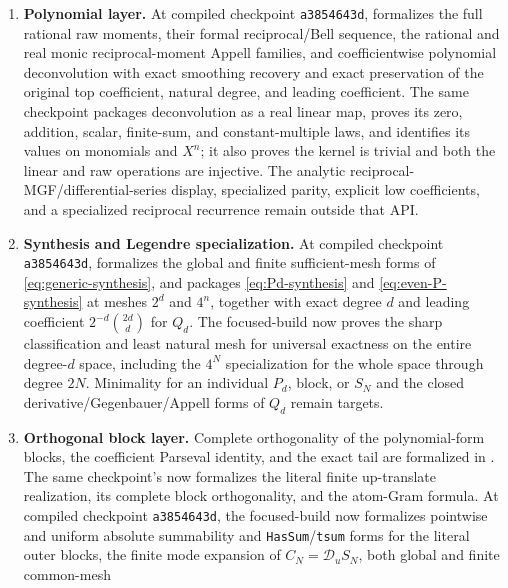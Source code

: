 \documentclass[11pt,oneside]{article}
\numberwithin{equation}{section}
\theoremstyle{definition}
\theoremstyle{remark}
\newcommand{\Dscr}{\mathscr D_u}
\begin{document}
\begin{enumerate}
 \item \textbf{Polynomial layer.}  At compiled checkpoint \texttt{a3854643d},
  formalizes the full rational raw moments,
 their formal reciprocal/Bell sequence, the rational and real monic
 reciprocal-moment Appell families, and coefficientwise polynomial
 deconvolution with exact smoothing recovery and exact preservation of the
 original top coefficient, natural degree, and leading coefficient.  The same
 checkpoint packages
 deconvolution as a real linear map, proves its zero, addition, scalar,
 finite-sum, and constant-multiple laws, and identifies its values on monomials
 and $X^n$; it also proves the kernel is trivial and both the linear and raw
 operations are injective.
 The analytic reciprocal-MGF/differential-series display, specialized parity,
 explicit low coefficients, and a specialized reciprocal recurrence remain
 outside that API.
 \item \textbf{Synthesis and Legendre specialization.}  At compiled checkpoint
 \texttt{a3854643d},  formalizes the
 global and finite sufficient-mesh forms of \eqref{eq:generic-synthesis}, and
  packages \eqref{eq:Pd-synthesis}
 and \eqref{eq:even-P-synthesis} at meshes $2^d$ and $4^n$, together with
 exact degree $d$ and leading coefficient $2^{-d}\binom{2d}{d}$ for $Q_d$.
 The focused-build  now proves the sharp
 classification and least natural mesh for universal exactness on the entire
 degree-$d$ space, including the $4^N$ specialization for the whole space
 through degree $2N$.  Minimality for an individual $P_d$, block, or $S_N$ and
 the closed derivative/Gegenbauer/Appell forms of $Q_d$ remain targets.
 \item \textbf{Orthogonal block layer.}  Complete orthogonality of the
 polynomial-form blocks, the coefficient Parseval identity, and the exact tail
 are formalized in .  The same checkpoint's
  now formalizes the literal finite
 up-translate realization, its complete block orthogonality, and the atom-Gram
 formula.  At compiled checkpoint \texttt{a3854643d}, the focused-build
  now
 formalizes pointwise and uniform absolute summability and
 \texttt{HasSum}/\texttt{tsum} forms for the literal outer blocks, the finite
 mode expansion of $C_N=\Dscr S_N$, both global and finite common-mesh

\end{enumerate}
\end{document}
